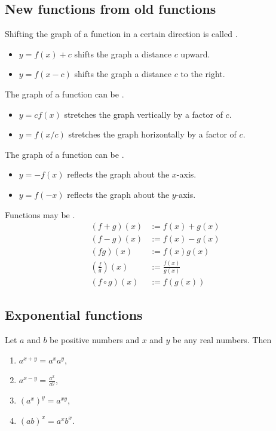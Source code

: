 \documentclass{article}
\begin{document}
\subsection{New functions from old functions}
\begin{definition}
    Shifting the graph of a function in a certain direction is called .
    \begin{itemize}
        \item $y = f(x) + c$ shifts the graph a distance $c$ upward.
        \item $y= f(x - c)$ shifts the graph a distance $c$ to the right.
    \end{itemize}
\end{definition}
\begin{definition}
    The graph of a function can be . 
    \begin{itemize}
        \item $y=cf(x)$ stretches the graph vertically by a factor of $c$.
        \item $y=f(x/c)$ stretches the graph horizontally by a factor of $c$.
    \end{itemize}
\end{definition}
\begin{definition}
    The graph of a function can be .
    \begin{itemize}
        \item $y=-f(x)$ reflects the graph about the $x$-axis.
        \item $y=f(-x)$ reflects the graph about the $y$-axis.
    \end{itemize}
\end{definition}
\begin{definition}
    Functions may be .
    \begin{align*}
        (f+g)(x) &:= f(x) + g(x)\\
        (f-g)(x) &:= f(x) - g(x)\\
        (fg)(x) &:= f(x)g(x)\\
        (\frac{f}{g})(x)&:=\frac{f(x)}{g(x)}\\
        (f\circ g)(x) &:= f(g(x))
    \end{align*}
\end{definition}
\setcounter{subsection}{4}
\subsection{Exponential functions}
\begin{theorem}
    Let $a$ and $b$ be positive numbers and $x$ and $y$ be any real numbers. Then
    \begin{enumerate}
        \item $a^{x+y}=a^xa^y$,
        \item $a^{x-y}=\frac{a^x}{a^y}$,
        \item $(a^x)^y=a^{xy}$,
        \item $(ab)^x=a^xb^x$.
    \end{enumerate}
\end{theorem}
\end{document}
